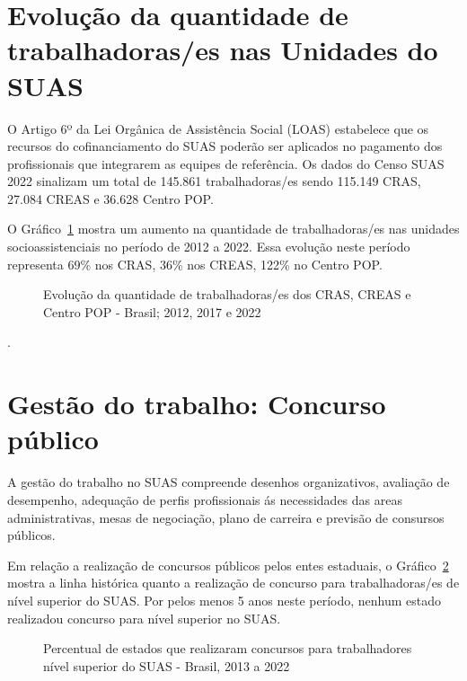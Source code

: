 \documentclass[
  letterpaper,
  DIV=11,
  numbers=noendperiod]{scrreprt}
\begin{document}
\section{Evolução da quantidade de trabalhadoras/es nas Unidades do
SUAS}\label{evoluuxe7uxe3o-da-quantidade-de-trabalhadorases-nas-unidades-do-suas}

O Artigo 6º da Lei Orgânica de Assistência Social (LOAS) estabelece que
os recursos do cofinanciamento do SUAS poderão ser aplicados no
pagamento dos profissionais que integrarem as equipes de referência. Os
dados do Censo SUAS 2022 sinalizam um total de 145.861 trabalhadoras/es
sendo 115.149 CRAS, 27.084 CREAS e 36.628 Centro POP.

O Gráfico~\ref{fig-trab-unidades} mostra um aumento na quantidade de
trabalhadoras/es nas unidades socioassistenciais no período de 2012 a
2022. Essa evolução neste período representa 69\% nos CRAS, 36\% nos
CREAS, 122\% no Centro POP.

\begin{figure}


\caption{\label{fig-trab-unidades}Evolução da quantidade de
trabalhadoras/es dos CRAS, CREAS e Centro POP - Brasil; 2012, 2017 e
2022}

\end{figure}%

.

\section{Gestão do trabalho: Concurso
público}\label{gestuxe3o-do-trabalho-concurso-puxfablico}

A gestão do trabalho no SUAS compreende desenhos organizativos,
avaliação de desempenho, adequação de perfis profissionais ás
necessidades das areas administrativas, mesas de negociação, plano de
carreira e previsão de consursos públicos.

Em relação a realização de concursos públicos pelos entes estaduais, o
Gráfico~\ref{fig-conc_estado} mostra a linha histórica quanto a
realização de concurso para trabalhadoras/es de nível superior do SUAS.
Por pelos menos 5 anos neste período, nenhum estado realizadou concurso
para nível superior no SUAS.

\begin{figure}


\caption{\label{fig-conc_estado}Percentual de estados que realizaram
concursos para trabalhadores nível superior do SUAS - Brasil, 2013 a
2022}

\end{figure}%
\end{document}
